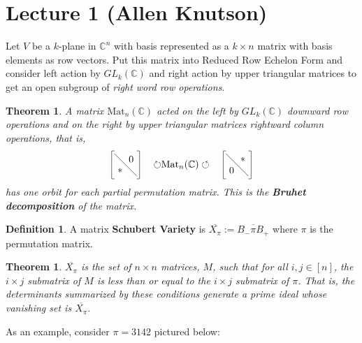 \documentclass[12pt]{amsart}
\numberwithin{equation}{section}
\newtheorem{Theorem}[equation]{Theorem}
\theoremstyle{definition}
\newtheorem{Definition}[equation]{Definition}
\numberwithin{figure}{section}
\newcommand{\C}{\mathbb{C}}
\begin{document}
\section{Lecture 1 (Allen Knutson)}

Let $V$ be a $k$-plane in $\C^n$ with basis represented as a $k\times n$ matrix with basis elements as row vectors. Put this matrix into Reduced Row Echelon Form and consider left action by $GL_k(\C)$ and right action by upper triangular matrices to get an open subgroup of \textit{right word row operations}.

\begin{Theorem}
	A matrix $\text{Mat}_n(\C)$ acted on the left by $GL_k(\C)$ downward row operations and  on the right by upper triangular matrices rightward column operations, that is,
	$$\begin{tikzpicture}
		\node (a) at (.3,.3) {$*$};
		\node (b) at (.7,.7) {$0$};
		\draw [-] (.9,.1) to (.1,.9);
		\draw[-] (0,0) to (0,1);
		\draw[-] (1,0) to (1,1);
		\draw[-] (0,0) to (.1,0);
		\draw[-] (0,1) to (.1,1);
		\draw[-] (.9,0) to (1,0);
		\draw[-] (.9,1) to (1,1);
		\node (c) at (2.5,.5) {$\circlearrowright$Mat$_n(\C)\circlearrowleft$};
		\node (a) at (4.3,.3) {$0$};
		\node (b) at (4.7,.7) {$*$};
		\draw [-] (4.9,.1) to (4.1,.9);
		\draw[-] (4,0) to (4,1);
		\draw[-] (5,0) to (5,1);
		\draw[-] (4,0) to (4.1,0);
		\draw[-] (4,1) to (4.1,1);
		\draw[-] (4.9,0) to (5,0);
		\draw[-] (4.9,1) to (5,1);
	\end{tikzpicture}$$
	has one orbit for each partial permutation matrix. This is the \textbf{Bruhet decomposition} of the matrix.
\end{Theorem}

\begin{Definition}
	A matrix \textbf{Schubert Variety} is $\overline{X_{\pi}}:=\overline{B_-\pi B_+}$ where $\pi$ is the permutation matrix.
\end{Definition}

\begin{Theorem}
	$\overline{X_\pi}$ is the set of $n\times n$ matrices, $M$, such that for all $i,j\in[n]$, the $i\times j$ submatrix of $M$ is less than or equal to the $i\times j$ submatrix of $\pi$. That is, the determinants summarized by these conditions generate a prime ideal whose vanishing set is $\overline{X_\pi}$.
\end{Theorem}

As an example, consider $\pi=3142$ pictured below:
\end{document}
